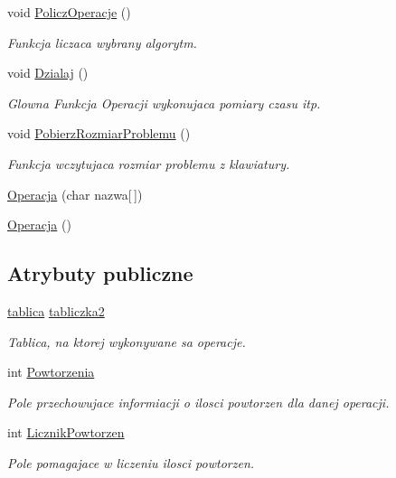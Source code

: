 \begin{DoxyCompactItemize}
void \hyperlink{class_operacja_add37253efa90cee5fa332cde6e163bab}{Policz\-Operacje} ()
\begin{DoxyCompactList}\small\item\em Funkcja liczaca wybrany algorytm. \end{DoxyCompactList}\item 
void \hyperlink{class_operacja_add48398ebfeae90a0d1b58a31962fd7d}{Dzialaj} ()
\begin{DoxyCompactList}\small\item\em Glowna Funkcja Operacji wykonujaca pomiary czasu itp. \end{DoxyCompactList}\item 
void \hyperlink{class_operacja_afa1d33f2045ce668becc90b56c1b6907}{Pobierz\-Rozmiar\-Problemu} ()
\begin{DoxyCompactList}\small\item\em Funkcja wczytujaca rozmiar problemu z klawiatury. \end{DoxyCompactList}\item 
\hyperlink{class_operacja_a9bfc12b2dfc5f736d46cf5d6c342f782}{Operacja} (char nazwa\mbox{[}$\,$\mbox{]})
\item 
\hyperlink{class_operacja_a1624fb5817c0b60e1680509fc4517732}{Operacja} ()
\end{DoxyCompactItemize}
\subsection*{Atrybuty publiczne}
\begin{DoxyCompactItemize}
\item 
\hyperlink{classtablica}{tablica} \hyperlink{class_operacja_abf2eb42f0b32b1528939aa39e0ebd528}{tabliczka2}
\begin{DoxyCompactList}\small\item\em Tablica, na ktorej wykonywane sa operacje. \end{DoxyCompactList}\item 
int \hyperlink{class_operacja_aa568b17d05f31132b3d97eb5b7e93d61}{Powtorzenia}
\begin{DoxyCompactList}\small\item\em Pole przechowujace informiacji o ilosci powtorzen dla danej operacji. \end{DoxyCompactList}\item 
int \hyperlink{class_operacja_a9af6bfee62f233a584f368a626e8329e}{Licznik\-Powtorzen}
\begin{DoxyCompactList}\small\item\em Pole pomagajace w liczeniu ilosci powtorzen. \end{DoxyCompactList}\end{DoxyCompactItemize}


